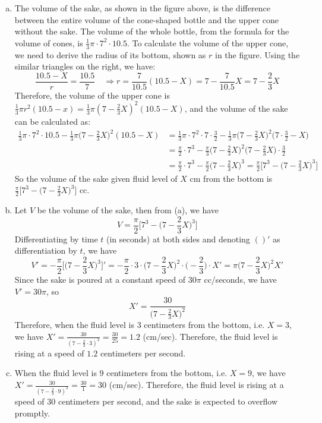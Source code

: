 \documentclass[11pt,letterpaper]{article}
\begin{document}
\begin{enumerate}[(a)]
    \item The volume of the sake, as shown in the figure above, is the difference between the entire volume of the cone-shaped bottle and the upper cone without the sake.  The volume of the whole bottle, from the formula for the volume of cones, is $\frac{1}{3}\pi \cdot 7^2 \cdot 10.5$.  To calculate the volume of the upper cone, we need to derive the radius of its bottom, shown as $r$ in the figure.  Using the similar triangles on the right, we have:
    \[\frac{10.5-X}{r} = \frac{10.5}{7} \quad \Rightarrow r = \frac{7}{10.5}(10.5-X) = 7-\frac{7}{10.5}X = 7-\frac{2}{3}X\]
    Therefore, the volume of the upper cone is $\frac{1}{3}\pi r^2 (10.5-x) = \frac{1}{3}\pi(7-\frac{2}{3}X)^2(10.5-X)$, and the volume of the sake can be calculated as:
    \begin{align*}
        \frac{1}{3}\pi \cdot 7^2 \cdot 10.5-\frac{1}{3}\pi\Big(7-\frac{2}{3}X\Big)^2(10.5-X) &= \frac{1}{3}\pi \cdot 7^2 \cdot 7 \cdot \frac{3}{2} -\frac{1}{3}\pi\Big(7-\frac{2}{3}X\Big)^2\Big(7 \cdot\frac{3}{2}-X\Big)\\
        &= \frac{\pi}{2}\cdot 7^3 - \frac{\pi}{3}\Big(7-\frac{2}{3}X\Big)^2\Big(7-\frac{2}{3}X\Big)\cdot \frac{3}{2}\\
        &= \frac{\pi}{2}\cdot 7^3 - \frac{\pi}{2}\Big(7-\frac{2}{3}X\Big)^3 = \frac{\pi}{2}\Big[7^3 - \Big(7-\frac{2}{3}X\Big)^3\Big]
    \end{align*}
    So the volume of the sake given fluid level of $X$ cm from the bottom is $\frac{\pi}{2}\big[7^3 - \big(7-\frac{2}{3}X\big)^3\big]$ cc.
    \item Let $V$ be the volume of the sake, then from (a), we have
    \[V = \frac{\pi}{2}\Big[7^3 - \Big(7-\frac{2}{3}X\Big)^3\Big]\]
    Differentiating by time $t$ (in seconds) at both sides and denoting $()'$ as differentiation by $t$, we have
    \[V' = -\frac{\pi}{2}\Big[\Big(7-\frac{2}{3}X\Big)^3\Big]' = -\frac{\pi}{2} \cdot 3 \cdot \Big(7-\frac{2}{3}X\Big)^2 \cdot \Big(-\frac{2}{3}\Big) \cdot X' = \pi \Big(7-\frac{2}{3}X\Big)^2 X'\]
    Since the sake is poured at a constant speed of $30 \pi$ cc/seconds, we have $V' = 30 \pi$, so
    \[X' = \frac{30}{\big(7-\frac{2}{3}X\big)^2}\]
    Therefore, when the fluid level is $3$ centimeters from the bottom, i.e. $X=3$, we have $X' = \frac{30}{(7-\frac{2}{3}\cdot 3)^2} = \frac{30}{25} = 1.2$ (cm/sec).  Therefore, the fluid level is rising at a speed of $1.2$ centimeters per second.
    \item When the fluid level is $9$ centimeters from the bottom, i.e. $X=9$, we have $X' = \frac{30}{(7-\frac{2}{3}\cdot 9)^2} = \frac{30}{1} = 30$ (cm/sec).  Therefore, the fluid level is rising at a speed of $30$ centimeters per second, and the sake is expected to overflow promptly.
\end{enumerate}\vspace{6mm}
\end{document}
